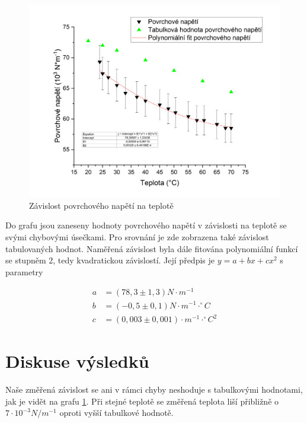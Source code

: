 \begin{figure}[h]
    \centering
    \includegraphics[width=1\linewidth]{14 - Studium teplotní závislosti povrchového napětí/Závislost povrchového napětí na teplotě.png}
    \caption{Závislost povrchového napětí na teplotě}
    \label{fig:napeti-na-teplote}
\end{figure}

\newpage

Do grafu jsou zaneseny hodnoty povrchového napětí v závislosti na teplotě se svými chybovými úsečkami. Pro srovnání je zde zobrazena také závislost tabulovaných hodnot. Naměřená závislost byla dále fitována polynomiální funkcí se stupněm 2, tedy kvadratickou závislostí. Její předpis je $y = a + bx + cx^2$ s parametry

\begin{align*}
    a &= (78,3 \pm 1,3) N \cdot m^{-1}\\
    b &= (-0,5 \pm 0,1) N \cdot m^{-1} \cdot ^\circ C\\
    c &= (0,003 \pm 0,001) \cdot m^{-1} \cdot ^\circ C^2
\end{align*}



\section{Diskuse výsledků}

Naše změřená závislost se ani v rámci chyby neshoduje s tabulkovými hodnotami, jak je vidět na grafu \ref{fig:napeti-na-teplote}. Při stejné teplotě se změřená teplota liší přibližně o $7 \cdot 10^{-3} N / m^{-1}$ oproti vyšší tabulkové hodnotě.

